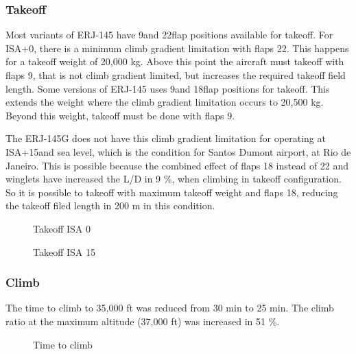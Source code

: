 ﻿%
\subsubsection{Takeoff}

Most variants of ERJ-145 have 9\degree and 22\degree flap positions available for takeoff. For ISA+0\celsius, there is a minimum climb gradient limitation with flaps 22. This happens for a takeoff weight of 20,000 kg. Above this point the aircraft must takeoff with flaps 9, that is not climb gradient limited, but increases the required takeoff field length. Some versions of ERJ-145 uses 9\degree and 18\degree flap positions for takeoff. This extends the weight where the climb gradient limitation occurs to 20,500 kg. Beyond this weight, takeoff must be done with flaps 9.

The ERJ-145G does not have this climb gradient limitation for operating at ISA+15\celsius and sea level, which is the condition for Santos Dumont airport, at Rio de Janeiro. This is possible because the combined effect of flaps 18 instead of 22 and winglets have increased the L/D in 9 \%, when climbing in takeoff configuration. So it is possible to takeoff with maximum takeoff weight and flaps 18, reducing the takeoff filed length in 200 m in this condition.

\begin{figure}[H] %
\caption{Takeoff ISA 0\degree}
\label{fig:fig1_takeoff_isa0}
\end{figure}

\begin{figure}[H] %
\caption{Takeoff ISA 15\degree}
\label{fig:fig2_takeoff_isa15}
\end{figure}

\subsubsection{Climb}

The time to climb to 35,000 ft was reduced from 30 min to 25 min. The climb ratio at the maximum altitude (37,000 ft) was increased in 51 \%.

\begin{figure}[H] %
\caption{Time to climb}
\label{fig:fig3_time2climb}
\end{figure}

